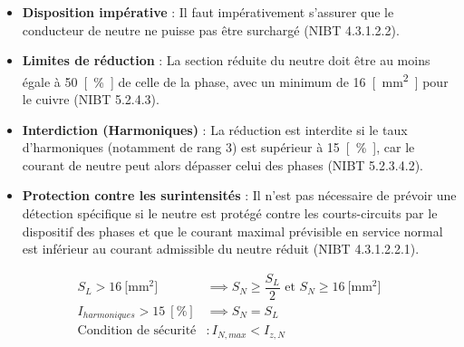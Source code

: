 \documentclass[a4paper,11pt,answers,addpoints]{exam}
\begin{document}
\begin{questions}
\begin{solution}
	\begin{itemize}
		\item \textbf{Disposition impérative} : Il faut impérativement s'assurer que le conducteur de neutre ne puisse pas être surchargé (NIBT 4.3.1.2.2).
		\item \textbf{Limites de réduction} : La section réduite du neutre doit être au moins égale à \qty{50}{[\percent]} de celle de la phase, avec un minimum de \qty{16}{[\milli\metre\squared]} pour le cuivre (NIBT {5.2.4.3}).
		\item \textbf{Interdiction (Harmoniques)} : La réduction est interdite si le taux d'harmoniques (notamment de rang 3) est supérieur à \qty{15}{[\percent]}, car le courant de neutre peut alors dépasser celui des phases (NIBT {5.2.3.4.2}).
		\item \textbf{Protection contre les surintensités} : Il n'est pas nécessaire de prévoir une détection spécifique si le neutre est protégé contre les courts-circuits par le dispositif des phases et que le courant maximal prévisible en service normal est inférieur au courant admissible du neutre réduit (NIBT {4.3.1.2.2.1}).
	\end{itemize}
	

	\begin{align*}
		S_L > \qty{16}{[\milli\metre\squared]} &\implies S_N \geq \dfrac{S_L}{2} \text{ et } S_N \geq \qty{16}{[\milli\metre\squared]} \\[6pt]
		I_{harmoniques} > \qty{15}{[\percent]} &\implies S_N = S_L \\[6pt]
		\text{Condition de sécurité} &: I_{N,max} < I_{z,N}
	\end{align*}
	
	
\end{solution}
\end{questions}
\end{document}
